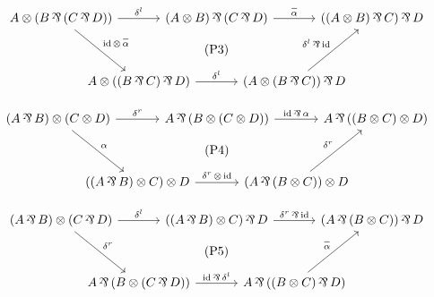\documentclass[reqno,12pt]{amsart}
\begin{document}
\begin{definition}
	\begingroup
	\renewcommand{\theequation}{\textup{P3}}
	\label{eq:P3}
	\begin{equation*}
		\begin{tikzcd}[column sep=-1cm, row sep=0.28cm]
			A\ot (B\prt {(C\prt D)}) && (A\ot B)\prt {(C\prt D)} && ((A\ot B)\prt C)\prt D \\
			&& \text{(P3)} && \\
			& A\ot ((B\prt C)\prt D) && (A\ot (B\prt C))\prt D &
			\arrow["\distl", from=1-1, to=1-3]
			\arrow["\ap", from=1-3, to=1-5]
			\arrow["\id\,\ot\,\ap", from=1-1, to=3-2]
			\arrow["\distl", from=3-2, to=3-4]
			\arrow["\distl\prt\id", from=3-4, to=1-5]
		\end{tikzcd}
	\end{equation*}
	\endgroup
	
	\begingroup
	\renewcommand{\theequation}{\textup{P4}}
	\label{eq:P4}
	\begin{equation*}
		\begin{tikzcd}[column sep=-1cm, row sep=0.28cm]
			(A\prt B)\ot (C\ot D) && A\prt {(B\ot (C\ot D))} && A\prt {((B\ot C)\ot D)} \\
			&& \text{(P4)} && \\
			& ((A\prt B)\ot C)\ot D && (A\prt {(B\ot C)})\ot D &
			\arrow["\distr", from=1-1, to=1-3]
			\arrow["\id\prt\ao", from=1-3, to=1-5]
			\arrow["\ao", from=1-1, to=3-2]
			\arrow["\distr\,\ot\,\id", from=3-2, to=3-4]
			\arrow["\distr", from=3-4, to=1-5]
		\end{tikzcd}
	\end{equation*}
	\endgroup
	
	\begingroup
	\renewcommand{\theequation}{\textup{P5}}
	\label{eq:P5}
	\begin{equation*}
		\begin{tikzcd}[column sep=-1cm, row sep=0.28cm]
			(A\prt B)\ot (C\prt D) && ((A\prt B)\ot C)\prt D && (A\prt {(B\ot C)})\prt D \\
			&& \text{(P5)} && \\
			&  A\prt {(B\ot (C\prt D))}  && A\prt {((B\ot C)\prt D)} &
			\arrow["\distl", from=1-1, to=1-3]
			\arrow["\distr\prt\id", from=1-3, to=1-5]
			\arrow["\distr", from=1-1, to=3-2]
			\arrow["\id\prt\distl", from=3-2, to=3-4]
			\arrow["\ap", from=3-4, to=1-5]
		\end{tikzcd}
	\end{equation*}
	\endgroup
	

\end{definition}
\end{document}
